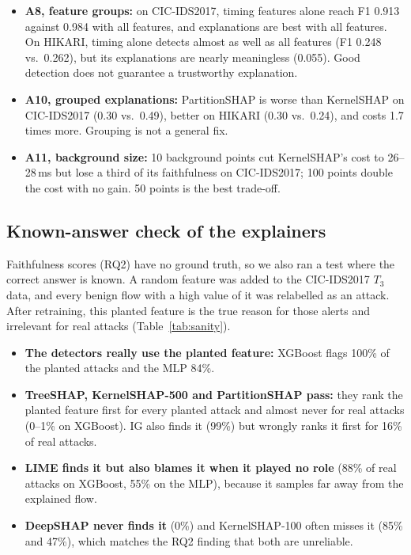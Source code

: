 \begin{itemize}[leftmargin=*, itemsep=0pt]
  \item \textbf{A8, feature groups:} on CIC-IDS2017, timing features alone reach F1 0.913 against 0.984 with all features, and explanations are best with all features. On HIKARI, timing alone detects almost as well as all features (F1 0.248 vs.\ 0.262), but its explanations are nearly meaningless (0.055). Good detection does not guarantee a trustworthy explanation.
  \item \textbf{A10, grouped explanations:} PartitionSHAP is worse than KernelSHAP on CIC-IDS2017 (0.30 vs.\ 0.49), better on HIKARI (0.30 vs.\ 0.24), and costs 1.7 times more. Grouping is not a general fix.
  \item \textbf{A11, background size:} 10 background points cut KernelSHAP's cost to 26--28\,ms but lose a third of its faithfulness on CIC-IDS2017; 100 points double the cost with no gain. 50 points is the best trade-off.
\end{itemize}

\subsection{Known-answer check of the explainers}
\label{sec:abl:sanity}
Faithfulness scores (RQ2) have no ground truth, so we also ran a test where the correct answer is known. A random feature was added to the CIC-IDS2017 $T_3$ data, and every benign flow with a high value of it was relabelled as an attack. After retraining, this planted feature is the true reason for those alerts and irrelevant for real attacks (Table~\ref{tab:sanity}).



\begin{itemize}[leftmargin=*, itemsep=0pt]
  \item \textbf{The detectors really use the planted feature:} XGBoost flags 100\% of the planted attacks and the MLP 84\%.
  \item \textbf{TreeSHAP, KernelSHAP-500 and PartitionSHAP pass:} they rank the planted feature first for every planted attack and almost never for real attacks (0--1\% on XGBoost). IG also finds it (99\%) but wrongly ranks it first for 16\% of real attacks.
  \item \textbf{LIME finds it but also blames it when it played no role} (88\% of real attacks on XGBoost, 55\% on the MLP), because it samples far away from the explained flow.
  \item \textbf{DeepSHAP never finds it} (0\%) and KernelSHAP-100 often misses it (85\% and 47\%), which matches the RQ2 finding that both are unreliable.
\end{itemize}

